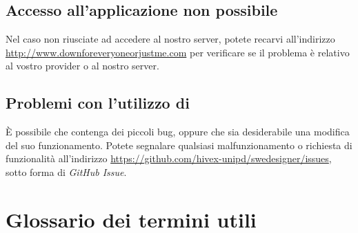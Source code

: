 \subsection{Accesso all'applicazione non possibile}

Nel caso non riusciate ad accedere al nostro server, potete recarvi all'indirizzo \url{http://www.downforeveryoneorjustme.com} per verificare se il problema è relativo al vostro provider o al nostro server.



\subsection{Problemi con l'utilizzo di \proj}

È possibile che \proj{} contenga dei piccoli bug, oppure che sia desiderabile una modifica del suo funzionamento. Potete segnalare qualsiasi malfunzionamento o richiesta di funzionalità all'indirizzo \url{https://github.com/hivex-unipd/swedesigner/issues}, sotto forma di \emph{GitHub Issue}.





\appendix


\section{Glossario dei termini utili} \label{app:gloss}


